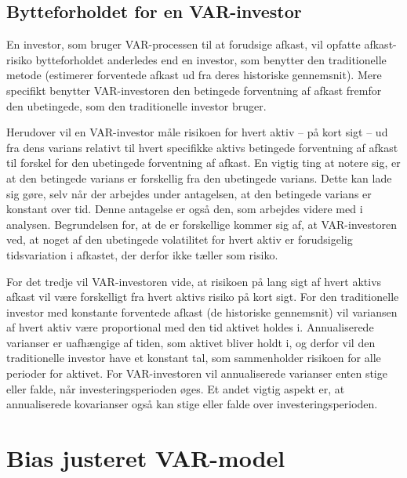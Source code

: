 \documentclass[
  a4paper,
  oneside]{memoir}
\begin{document}
\subsection{Bytteforholdet for en VAR-investor}

En investor, som bruger VAR-processen til at forudsige afkast, vil opfatte afkast-risiko bytteforholdet anderledes end en investor, som benytter den traditionelle metode (estimerer forventede afkast ud fra deres historiske gennemsnit). Mere specifikt benytter VAR-investoren den betingede forventning af afkast fremfor den ubetingede, som den traditionelle investor bruger.

Herudover vil en VAR-investor måle risikoen for hvert aktiv -- på kort sigt -- ud fra dens varians relativt til hvert specifikke aktivs betingede forventning af afkast til forskel for den ubetingede forventning af afkast. En vigtig ting at notere sig, er at den betingede varians er forskellig fra den ubetingede varians. Dette kan lade sig gøre, selv når der arbejdes under antagelsen, at den betingede varians er konstant over tid. Denne antagelse er også den, som arbejdes videre med i analysen. Begrundelsen for, at de er forskellige kommer sig af, at VAR-investoren ved, at noget af den ubetingede volatilitet for hvert aktiv er forudsigelig tidsvariation i afkastet, der derfor ikke tæller som risiko.

For det tredje vil VAR-investoren vide, at risikoen på lang sigt af hvert aktivs afkast vil være forskelligt fra hvert aktivs risiko på kort sigt. For den traditionelle investor med konstante forventede afkast (de historiske gennemsnit) vil variansen af hvert aktiv være proportional med den tid aktivet holdes i. Annualiserede varianser er uafhængige af tiden, som aktivet bliver holdt i, og derfor vil den traditionelle investor have et konstant tal, som sammenholder risikoen for alle perioder for aktivet. For VAR-investoren vil annualiserede varianser enten stige eller falde, når investeringsperioden øges. Et andet vigtig aspekt er, at annualiserede kovarianser også kan stige eller falde over investeringsperioden.

\hypertarget{bias-justeret-var-model}{%
\section{Bias justeret VAR-model}\label{bias-justeret-var-model}}
\end{document}
